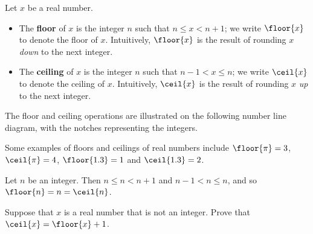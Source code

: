 \begin{definition}
Let $x$ be a real number.
\begin{itemize}
\item The \textbf{floor} of $x$ is the integer $n$ such that $n \le x < n+1$; we write $\floor{x}$ to denote the floor of $x$. Intuitively, $\floor{x}$ is the result of rounding $x$ \textit{down} to the next integer.
\item The \textbf{ceiling} of $x$ is the integer $n$ such that $n-1 < x \le n$; we write $\ceil{x}$ to denote the ceiling of $x$. Intuitively, $\ceil{x}$ is the result of rounding $x$ \textit{up} to the next integer.
\end{itemize}

The floor and ceiling operations are illustrated on the following number line diagram, with the notches representing the integers.
\begin{center}
\end{center}
\end{definition}

\begin{example}
Some examples of floors and ceilings of real numbers include $\floor{\pi} = 3$, $\ceil{\pi} = 4$, $\floor{1.3} = 1$ and $\ceil{1.3} = 2$.
\end{example}

\begin{example}
Let $n$ be an integer. Then $n \le n < n+1$ and $n-1 < n \le n$, and so $\floor{n} = n = \ceil{n}$.
\end{example}

\begin{exercise}
Suppose that $x$ is a real number that is not an integer. Prove that $\ceil{x} = \floor{x} + 1$.
%
%
\end{exercise}

